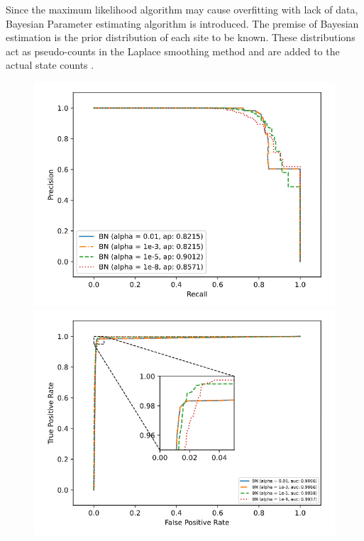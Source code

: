 \documentclass[journal,twoside]{IEEEtran}
\begin{document}
Since the maximum likelihood algorithm may cause overfitting with lack of data, Bayesian Parameter estimating algorithm is introduced. The premise of Bayesian estimation is the prior distribution of each site to be known. These distributions act as pseudo-counts in the Laplace smoothing method \cite{schutze2008introduction} and are added to the actual state counts \cite{koller2009probabilistic}. 

\begin{figure}[htbp]
\centerline{\includegraphics[scale=0.35]{Pics/bn_prcurve.png}
    \includegraphics[scale=0.35]{Pics/bn_roccurve.png}}

\end{figure}
\end{document}
